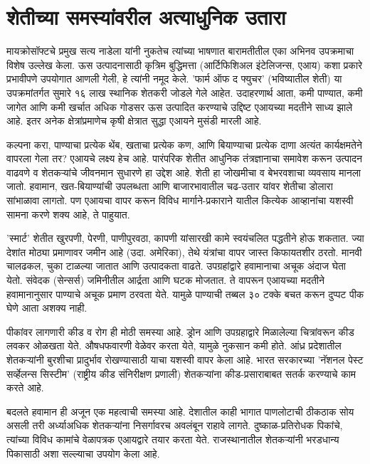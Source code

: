 \chapter{शेतीच्या समस्यांवरील अत्याधुनिक उतारा}

मायक्रोसॉफ्टचे प्रमुख सत्य नाडेला यांनी नुकतेच त्यांच्या भाषणात बारामतीतील एका अभिनव उपक्रमाचा विशेष उल्लेख केला. ऊस उत्पादनासाठी कृत्रिम बुद्धिमत्ता (आर्टिफिशिअल इंटेलिजन्स, एआय) कशा प्रकारे प्रभावीपणे उपयोगात आणली गेली, हे त्यांनी नमूद केले. 'फार्म ऑफ द फ्युचर' (भविष्यातील शेती) या उपक्रमांतर्गत सुमारे १६ लाख स्थानिक शेतकरी जोडले गेले आहेत. उदाहरणार्थ आता, कमी पाण्यात, कमी जागेत आणि कमी खर्चात अधिक गोडसर ऊस उत्पादित करण्याचे उद्दिष्ट एआयच्या मदतीने साध्य झाले आहे. इतर अनेक क्षेत्रांप्रमाणेच कृषी क्षेत्रात सुद्धा एआयने मुसंडी मारली आहे.

कल्पना करा, पाण्याचा प्रत्येक थेंब, खताचा प्रत्येक कण, आणि बियाण्याचा प्रत्येक दाणा अत्यंत कार्यक्षमतेने वापरला गेला तर? एआयचे लक्ष्य हेच आहे. पारंपरिक शेतीत आधुनिक तंत्रज्ञानाचा समावेश करून उत्पादन वाढवणे व शेतकऱ्यांचे जीवनमान सुधारणे हा उद्देश आहे. शेती हा जोखमीचा व बेभरवशाचा व्यवसाय मानला जातो. हवामान, खत-बियाण्यांची उपलब्धता आणि बाजारभावातील चढ-उतार यांवर शेतीचा डोलारा सांभाळावा लागतो. पण एआयचा वापर करून विविध मार्गाने-प्रकाराने यातील कित्येक आव्हानांचा यशस्वी सामना करणे शक्य आहे, ते पाहुयात.

'स्मार्ट' शेतीत खुरपणी, पेरणी, पाणीपुरवठा, कापणी यांसारखी कामे स्वयंचलित पद्धतीने होऊ शकतात. ज्या देशांत मोठ्या प्रमाणावर जमीन आहे (उदा. अमेरिका), तेथे यंत्रांचा वापर जास्त किफायतशीर ठरतो. मानवी चालढकल, चुका टाळल्या जातात आणि उत्पादकता वाढते. उपग्रहांद्वारे हवामानाचा अचूक अंदाज घेता येतो. संवेदक (सेन्सर्स) जमिनीतील आर्द्रता आणि घटक मोजतात. ते वापरून एआयच्या मदतीने हवामानानुसार पाण्याचे अचूक प्रमाण ठरवता येते. यामुळे पाण्याची तब्बल ३० टक्के बचत करून दुप्पट पीक घेणे आता अशक्य नाही.

पीकांवर लागणारी कीड व रोग ही मोठी समस्या आहे. ड्रोन आणि उपग्रहाद्वारे मिळालेल्या चित्रांवरून कीड लवकर ओळखता येते. औषधफवारणी वेळेवर करता येते, यामुळे नुकसान कमी होते. आंध्र प्रदेशातील शेतकऱ्यांनी बुरशीचा प्रादुर्भाव रोखण्यासाठी याचा यशस्वी वापर केला आहे. भारत सरकारच्या 'नॅशनल पेस्ट सर्व्हेलन्स सिस्टीम' (राष्ट्रीय कीड संनिरीक्षण प्रणाली) शेतकऱ्यांना कीड-प्रसाराबाबत सतर्क करण्याचे काम करते आहे.

बदलते हवामान ही अजून एक महत्वाची समस्या आहे. देशातील काही भागात पाणलोटाची ठीकठाक सोय असली तरी अर्ध्याअधिक शेतकऱ्यांना निसर्गावरच अवलंबून राहावे लागते. दुष्काळ-प्रतिरोधक पिकांचे, त्यांच्या विविध कामांचे वेळापत्रक एआयद्वारे तयार करता येते. राजस्थानातील शेतकऱ्यांनी भरडधान्य पिकासाठी अशा सल्ल्याचा उपयोग केला आहे.


